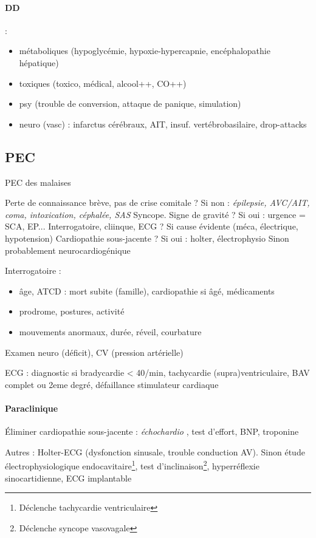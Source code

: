 \paragraph{DD} : 
\begin{itemize}
  \item métaboliques (hypoglycémie, hypoxie-hypercapnie,
encéphalopathie hépatique)
\item toxiques (toxico, médical, alcool++, CO++)
\item psy (trouble de conversion, attaque de panique, simulation)
\item neuro (vasc) : infarctus cérébraux, AIT, insuf. vertébrobasilaire,
  drop-attacks
\end{itemize}

\subsection{PEC}
\begin{algorithm}
  \caption{PEC des malaises}
   Perte de connaissance brève, pas de crise comitale ? Si non : \textit{épilepsie,
    AVC/AIT, coma, intoxication, céphalée, SAS} \faHandStopO\;
   Syncope. Signe de gravité ? Si oui : urgence = SCA, EP... \faHandStopO\;
   Interrogatoire, cliinque, ECG ? Si cause évidente (méca, électrique,
    hypotension) \faHandStopO\;
   Cardiopathie sous-jacente ? Si oui : holter, électrophysio\;
   Sinon probablement neurocardiogénique
\end{algorithm}

Interrogatoire :
\begin{itemize}
  \item âge, ATCD : mort subite (famille), cardiopathie si âgé, médicaments
  \item prodrome, postures, activité
  \item mouvements anormaux, durée, réveil, courbature
\end{itemize}
Examen neuro (déficit), CV (pression artérielle)

ECG : diagnostic si bradycardie < 40/min, tachycardie (supra)ventriculaire, BAV
complet ou 2eme degré, défaillance stimulateur cardiaque

\paragraph{Paraclinique}
Éliminer cardiopathie sous-jacente : \textit{échochardio} , test d'effort, BNP,
troponine

Autres : Holter-ECG (dysfonction sinusale, trouble conduction AV). Sinon
étude électrophysiologique endocavitaire\footnote{Déclenche tachycardie
ventriculaire}, test d'inclinaison\footnote{Déclenche syncope vasovagale},
hyperréflexie sinocartidienne, ECG implantable

